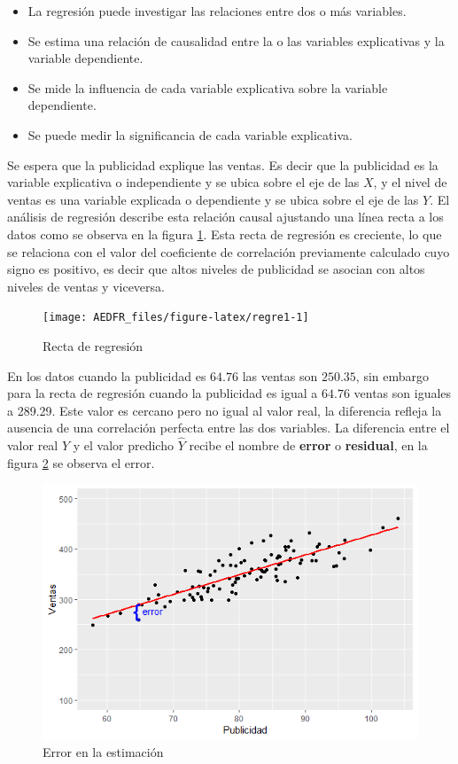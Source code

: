 \documentclass[letterpaper,]{book}
\providecommand{\tightlist}{%
  \setlength{\itemsep}{0pt}\setlength{\parskip}{0pt}}
\begin{document}
\begin{itemize}
\tightlist
\item
  La regresión puede investigar las relaciones entre dos o más variables.
\item
  Se estima una relación de causalidad entre la o las variables explicativas y la variable dependiente.
\item
  Se mide la influencia de cada variable explicativa sobre la variable dependiente.
\item
  Se puede medir la significancia de cada variable explicativa.
\end{itemize}

Se espera que la publicidad explique las ventas. Es decir que la publicidad es la variable explicativa o independiente y se ubica sobre el eje de las \(X\), y el nivel de ventas es una variable explicada o dependiente y se ubica sobre el eje de las \(Y\). El análisis de regresión describe esta relación causal ajustando una línea recta a los datos como se observa en la figura \ref{fig:regre1}. Esta recta de regresión es creciente, lo que se relaciona con el valor del coeficiente de correlación previamente calculado cuyo signo es positivo, es decir que altos niveles de publicidad se asocian con altos niveles de ventas y viceversa.

\begin{figure}[h]

{\centering \texttt{[image: AEDFR\_files/figure-latex/regre1-1]} 

}

\caption{Recta de regresión}\label{fig:regre1}
\end{figure}

En los datos cuando la publicidad es \(64.76\) las ventas son \(250.35\), sin embargo para la recta de regresión cuando la publicidad es igual a \(64.76\) ventas son iguales a 289.29. Este valor es cercano pero no igual al valor real, la diferencia refleja la ausencia de una correlación perfecta entre las dos variables. La diferencia entre el valor real \(Y\) y el valor predicho \(\hat{Y}\) recibe el nombre de \textbf{error} o \textbf{residual}, en la figura \ref{fig:error1} se observa el error.

\begin{figure}[h]

{\centering \includegraphics[width=0.6\linewidth]{error} 

}

\caption{Error en la estimación}\label{fig:error1}
\end{figure}
\end{document}
